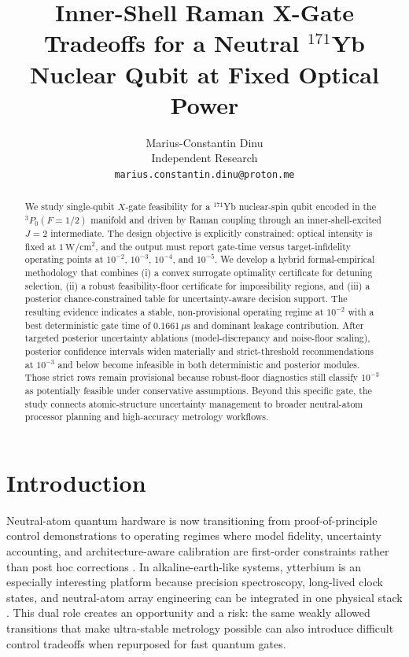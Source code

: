 \documentclass{article} %
\title{Inner-Shell Raman X-Gate Tradeoffs for a Neutral $^{171}$Yb Nuclear Qubit at Fixed Optical Power}
\author{Marius-Constantin Dinu \\
Independent Research \\
\texttt{marius.constantin.dinu@proton.me}}
\begin{document}
\maketitle

\begin{abstract}
We study single-qubit $X$-gate feasibility for a $^{171}$Yb nuclear-spin qubit encoded in the $^3P_0(F=1/2)$ manifold and driven by Raman coupling through an inner-shell-excited $J=2$ intermediate. The design objective is explicitly constrained: optical intensity is fixed at $1\,\mathrm{W/cm^2}$, and the output must report gate-time versus target-infidelity operating points at $10^{-2}$, $10^{-3}$, $10^{-4}$, and $10^{-5}$. We develop a hybrid formal-empirical methodology that combines (i) a convex surrogate optimality certificate for detuning selection, (ii) a robust feasibility-floor certificate for impossibility regions, and (iii) a posterior chance-constrained table for uncertainty-aware decision support. The resulting evidence indicates a stable, non-provisional operating regime at $10^{-2}$ with a best deterministic gate time of $0.1661\,\mu\mathrm{s}$ and dominant leakage contribution. After targeted posterior uncertainty ablations (model-discrepancy and noise-floor scaling), posterior confidence intervals widen materially and strict-threshold recommendations at $10^{-3}$ and below become infeasible in both deterministic and posterior modules. Those strict rows remain provisional because robust-floor diagnostics still classify $10^{-3}$ as potentially feasible under conservative assumptions. Beyond this specific gate, the study connects atomic-structure uncertainty management to broader neutral-atom processor planning and high-accuracy metrology workflows.
\end{abstract}

\section{Introduction}
Neutral-atom quantum hardware is now transitioning from proof-of-principle control demonstrations to operating regimes where model fidelity, uncertainty accounting, and architecture-aware calibration are first-order constraints rather than post hoc corrections \citep{S08,S13,S14,S15}. In alkaline-earth-like systems, ytterbium is an especially interesting platform because precision spectroscopy, long-lived clock states, and neutral-atom array engineering can be integrated in one physical stack \citep{S02,S03,S04,S07,S17,S20,S21}. This dual role creates an opportunity and a risk: the same weakly allowed transitions that make ultra-stable metrology possible can also introduce difficult control tradeoffs when repurposed for fast quantum gates.
\end{document}
